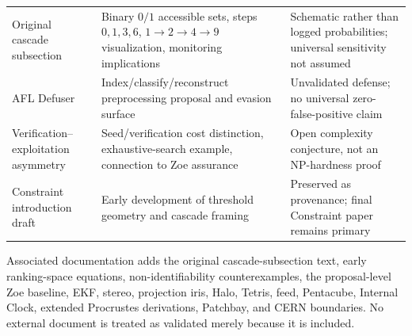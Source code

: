 \begin{table}[htbp]
{\begin{tabularx}{\textwidth}{p{4.0cm}Xp{3.5cm}}
Original cascade subsection&Binary $0/1$ accessible sets, steps $0,1,3,6$, $1\rightarrow2\rightarrow4\rightarrow9$ visualization, monitoring implications&Schematic rather than logged probabilities; universal sensitivity not assumed\\
AFL Defuser&Index/classify/reconstruct preprocessing proposal and evasion surface&Unvalidated defense; no universal zero-false-positive claim\\
Verification--exploitation asymmetry&Seed/verification cost distinction, exhaustive-search example, connection to Zoe assurance&Open complexity conjecture, not an NP-hardness proof\\
Constraint introduction draft&Early development of threshold geometry and cascade framing&Preserved as provenance; final Constraint paper remains primary\\
\bottomrule
\end{tabularx}}
\end{table}

Associated documentation adds the original cascade-subsection text, early ranking-space equations, non-identifiability counterexamples, the proposal-level Zoe baseline, EKF, stereo, projection iris, Halo, Tetris, feed, Pentacube, Internal Clock, extended Procrustes derivations, Patchbay, and CERN boundaries. No external document is treated as validated merely because it is included.

